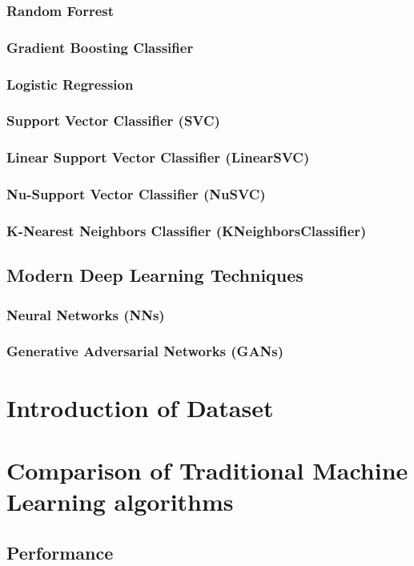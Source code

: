 \subsubsection{Random Forrest}
\subsubsection{Gradient Boosting Classifier}
\subsubsection{Logistic Regression}
\subsubsection{Support Vector Classifier (SVC)}
\subsubsection{Linear Support Vector Classifier (LinearSVC)}
\subsubsection{Nu-Support Vector Classifier (NuSVC)}
\subsubsection{K-Nearest Neighbors Classifier (KNeighborsClassifier)}
\subsection{Modern Deep Learning Techniques}
\subsubsection{Neural Networks (NNs)}
\subsubsection{Generative Adversarial Networks (GANs)}


\section{Introduction of Dataset}


\section{Comparison of Traditional Machine Learning algorithms}
\subsection{Performance}

